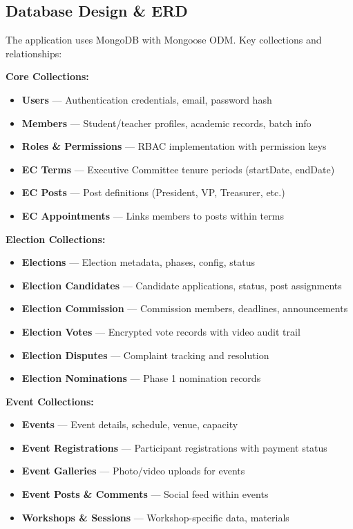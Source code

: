 \documentclass[12pt,a4paper]{article}
\begin{document}
\subsection{Database Design \& ERD}

The application uses MongoDB with Mongoose ODM. Key collections and relationships:

\textbf{Core Collections:}
\begin{itemize}[noitemsep]
  \item \textbf{Users} — Authentication credentials, email, password hash
  \item \textbf{Members} — Student/teacher profiles, academic records, batch info
  \item \textbf{Roles \& Permissions} — RBAC implementation with permission keys
  \item \textbf{EC Terms} — Executive Committee tenure periods (startDate, endDate)
  \item \textbf{EC Posts} — Post definitions (President, VP, Treasurer, etc.)
  \item \textbf{EC Appointments} — Links members to posts within terms
\end{itemize}

\textbf{Election Collections:}
\begin{itemize}[noitemsep]
  \item \textbf{Elections} — Election metadata, phases, config, status
  \item \textbf{Election Candidates} — Candidate applications, status, post assignments
  \item \textbf{Election Commission} — Commission members, deadlines, announcements
  \item \textbf{Election Votes} — Encrypted vote records with video audit trail
  \item \textbf{Election Disputes} — Complaint tracking and resolution
  \item \textbf{Election Nominations} — Phase 1 nomination records
\end{itemize}

\textbf{Event Collections:}
\begin{itemize}[noitemsep]
  \item \textbf{Events} — Event details, schedule, venue, capacity
  \item \textbf{Event Registrations} — Participant registrations with payment status
  \item \textbf{Event Galleries} — Photo/video uploads for events
  \item \textbf{Event Posts \& Comments} — Social feed within events
  \item \textbf{Workshops \& Sessions} — Workshop-specific data, materials
\end{itemize}
\end{document}
